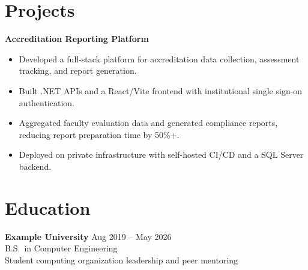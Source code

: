 \documentclass[10pt]{article}
\begin{document}
\section*{Projects}

\textbf{Accreditation Reporting Platform}
\begin{itemize}
    \item Developed a full-stack platform for accreditation data collection, assessment tracking, and report generation.
    \item Built .NET APIs and a React/Vite frontend with institutional single sign-on authentication.
    \item Aggregated faculty evaluation data and generated compliance reports, reducing report preparation time by 50\%+.
    \item Deployed on private infrastructure with self-hosted CI/CD and a SQL Server backend.
\end{itemize}

\section*{Education}
\textbf{Example University} \hfill Aug 2019 -- May 2026 \\
B.S.\ in Computer Engineering \\
Student computing organization leadership and peer mentoring
\end{document}
